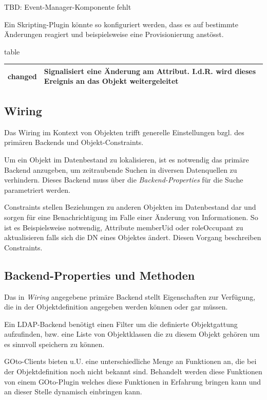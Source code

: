TBD: Event-Manager-Komponente fehlt

Ein Skripting-Plugin könnte so konfiguriert werden, dass es auf bestimmte Änderungen
reagiert und beispielsweise eine Provisionierung anstösst.

\begin{nofloat}{table}
 \begin{center}
  \begin{tabularx}{\textwidth}[]{|X|X|}
   \hline
   changed    & Signalisiert eine Änderung am Attribut. I.d.R. wird dieses Ereignis an das Objekt weitergeleitet\\
   \hline
  \end{tabularx}
 \end{center}
\end{nofloat}

\subsection{Wiring}

Das Wiring im Kontext von Objekten trifft generelle Einstellungen bzgl. des primären
Backends und Objekt-Constraints.

Um ein Objekt im Datenbestand zu lokalisieren, ist es notwendig das primäre
Backend anzugeben, um zeitraubende Suchen in diversen Datenquellen zu verhindern. Dieses
Backend muss über die \textit{Backend-Properties} für die Suche parametriert werden.

Constraints stellen Beziehungen zu anderen Objekten im Datenbestand dar und sorgen
für eine Benachrichtigung im Falle einer Änderung von Informationen. So ist es
Beispielsweise notwendig, Attribute memberUid oder roleOccupant zu aktualisieren
falls sich die DN eines Objektes ändert. Diesen Vorgang beschreiben Constraints.

\subsection{Backend-Properties und Methoden}

Das in \textit{Wiring} angegebene primäre Backend stellt Eigenschaften zur Verfügung,
die in der Objektdefinition angegeben werden können oder gar müssen.

Ein LDAP-Backend benötigt einen Filter um die definierte Objektgattung aufzufinden,
bzw. eine Liste von Objektklassen die zu diesem Objekt gehören um es sinnvoll
speichern zu können.

GOto-Clients bieten u.U. eine unterschiedliche Menge an Funktionen an, die bei der
Objektdefinition noch nicht bekannt sind. Behandelt werden diese Funktionen von
einem GOto-Plugin welches diese Funktionen in Erfahrung bringen kann und an dieser
Stelle dynamisch einbringen kann.

